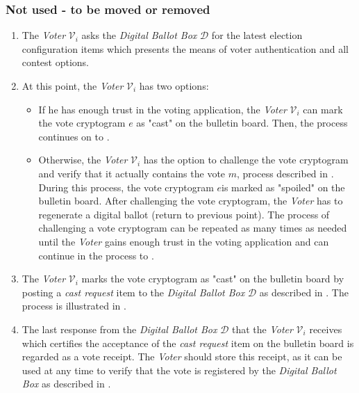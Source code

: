 \color{orange}
\subsubsection{Not used - to be moved or removed}
\begin{enumerate}
    \item The \textit{Voter} $\mathcal{V}_i$ asks the \textit{Digital Ballot Box} $\mathcal{D}$ for the latest election configuration items which presents the means of voter authentication and all contest options.
    
    \item At this point, the \textit{Voter} $\mathcal{V}_i$ has two options:
    \begin{itemize}
        \item If he has enough trust in the voting application, the \textit{Voter} $\mathcal{V}_i$ can mark the vote cryptogram $e$ as "cast" on the bulletin board. Then, the process continues on to .
        
        \item Otherwise, the \textit{Voter} $\mathcal{V}_i$ has the option to challenge the vote cryptogram and verify that it actually contains the vote $m$, process described in . During this process, the vote cryptogram $e$is marked as "spoiled" on the bulletin board. After challenging the vote cryptogram, the \textit{Voter} has to regenerate a digital ballot (return to previous point). The process of challenging a vote cryptogram can be repeated as many times as needed until the \textit{Voter} gains enough trust in the voting application and can continue in the process to .
    \end{itemize}
    
    \item \label{itm: cast vote} The \textit{Voter} $\mathcal{V}_i$ marks the vote cryptogram as "cast" on the bulletin board by posting a \textit{cast request} item to the \textit{Digital Ballot Box} $\mathcal{D}$ as described in . The process is illustrated in .
    
    \item The last response from the \textit{Digital Ballot Box} $\mathcal{D}$ that the \textit{Voter} $\mathcal{V}_i$ receives which certifies the acceptance of the \textit{cast request} item on the bulletin board is regarded as a vote receipt. The \textit{Voter} should store this receipt, as it can be used at any time to verify that the vote is registered by the \textit{Digital Ballot Box} as described in .
\end{enumerate}
\color{black}








